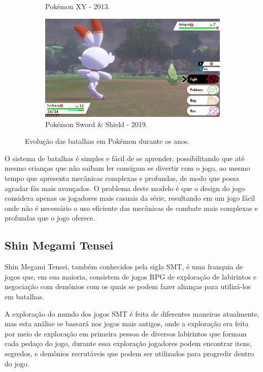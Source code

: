 \documentclass[
	12pt,				%
	openright,			%
	twoside,			%
	a4paper,			%
	english,			%
	french,				%
	spanish,			%
	brazil				%
	]{abntex2}
\begin{document}
\begin{figure}[h!]
\begin{subfigure}[b]{0.6\linewidth}
    \caption{Pokémon XY - 2013.}
  \end{subfigure}
  \begin{subfigure}[b]{0.6\linewidth}
    \includegraphics[width=\linewidth]{swsh.jpg}
    \caption{Pokémon Sword \& Shield - 2019.}
  \end{subfigure}
  \caption{Evolução das batalhas em Pokémon durante os anos.}
  \label{fig:pokemon2}
\end{figure}

O sistema de batalhas é simples e fácil de se aprender, possibilitando que até mesmo crianças que não saibam ler consigam se divertir com o jogo, ao mesmo tempo que apresenta mecânicas complexas e profundas, de modo que possa agradar fãs mais avançados. O problema deste modelo é que o design do jogo considera apenas os jogadores mais casuais da série, resultando em um jogo fácil onde não é necessário o uso eficiente das mecânicas de combate mais complexas e profundas que o jogo oferece.

\subsection{Shin Megami Tensei}

Shin Megami Tensei, também conhecidos pela sigla SMT, é uma franquia de jogos que, em sua maioria, consistem de jogos RPG de exploração de labirintos e negociação com demônios com os quais se podem fazer alianças para utilizá-los em batalhas.

	A exploração do mundo dos jogos SMT é feita de diferentes maneiras atualmente, mas esta análise se baseará nos jogos mais antigos, onde a exploração era feita por meio de exploração em primeira pessoa de diversos labirintos que formam cada pedaço do jogo, durante essa exploração jogadores podem encontrar itens, segredos, e demônios recrutáveis que podem ser utilizados para progredir dentro do jogo.
\end{document}
